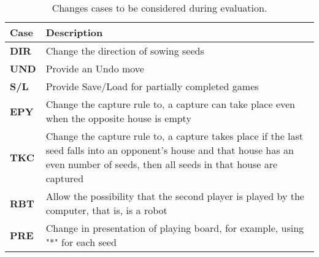 \begin{table}[H]
	\renewcommand{\arraystretch}{1.3}	
	\caption{Changes cases to be considered during evaluation.}
	\label{tab:cases}
	\centering
	\begin{tabularx}{\columnwidth}{@{}lX@{}}
		\toprule
		\toprule
		\textbf{Case} & \textbf{Description} \\
		\midrule
		\textbf{DIR} & Change the direction of sowing seeds \\
		\textbf{UND} & Provide an Undo move \\
		\textbf{S/L} & Provide Save/Load for partially completed games \\
		\textbf{EPY} & Change the capture rule to, a capture can take place even when the opposite house is empty \\
		\textbf{TKC} & Change the capture rule to, a capture takes place if the last seed falls into an opponent's house and that house has an even number of seeds, then all seeds in that house are captured \\
		\textbf{RBT} & Allow the possibility that the second player is played by the computer, that is, is a robot \\
		\textbf{PRE} & Change in presentation of playing board, for example, using "*" for each seed \\
		\bottomrule
		\bottomrule
	\end{tabularx}
\end{table}